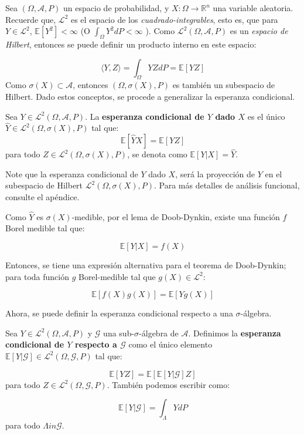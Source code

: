 

Sea $(\Omega, \mathcal{A}, P)$ un espacio de probabilidad, y $X: \Omega \rightarrow \mathbb{R}^n$ una variable aleatoria. Recuerde que, $\mathcal{L}^2$ es el espacio de los \textit{cuadrado-integrables}, esto es, que para $Y \in \mathcal{L}^2$, $\mathbb{E}[Y^2] < \infty$ (O $\int_{\Omega} Y^2 dP < \infty $ ). Como $\mathcal{L}^2 (\Omega, \mathcal{A}, P)$ es un \textit{espacio de Hilbert}, entonces se puede definir un producto interno en este espacio:

\[
	\langle Y, Z \rangle = \int_{\Omega} Y Z dP = \mathbb{E}[YZ]
\]
Como $\sigma(X) \subset \mathcal{A}$, entonces $(\Omega, \sigma(X), P)$ es también un subespacio de Hilbert. Dado estos conceptos, se procede a generalizar la esperanza condicional.

\begin{boxDef}
	Sea $Y \in \mathcal{L}^2 (\Omega, \mathcal{A}, P)$. La \textbf{esperanza condicional de $Y$ dado $X$} es el único $\hat{Y} \in \mathcal{L}^2 (\Omega, \sigma(X), P)$ tal que:
	\[
		\mathbb{E}[\hat{Y}X] = \mathbb{E}[YZ]
	\]
	para todo $Z \in \mathcal{L}^2 (\Omega, \sigma(X), P)$, se denota como $\mathbb{E}[Y \vert X] = \hat{Y}$.
\end{boxDef}

Note que la esperanza condicional de $Y$ dado $X$, será la proyección de $Y$ en el subespacio de Hilbert $\mathcal{L}^2 (\Omega, \sigma(X), P)$. Para más detalles de análisis funcional, consulte el apéndice.

Como $\hat{Y}$ es $\sigma (X)$-medible, por el lema de Doob-Dynkin, existe una función $f$ Borel medible tal que:

\[
	\mathbb{E}[Y \vert X] = f(X)
\]

Entonces, se tiene una expresión alternativa para el teorema de Doob-Dynkin; para toda función $g$ Borel-medible tal que $g(X) \in \mathcal{L}^2$:

\[
	\mathbb{E}[f(X) g(X)] = \mathbb{E}[Y g(X)]
\]

Ahora, se puede definir la esperanza condicional respecto a una $\sigma$-álgebra.

\begin{boxDef}
	Sea $Y \in \mathcal{L}^2 (\Omega, \mathcal{A}, P)$ y $\mathcal{G}$ una sub-$\sigma$-álgebra de $\mathcal{A}$. Definimos la \textbf{esperanza condicional de $Y$ respecto a $\mathcal{G}$} como el único elemento $\mathbb{E}[Y \vert \mathcal{G}] \in \mathcal{L}^2 (\Omega, \mathcal{G}, P)$ tal que:

	\[
		\mathbb{E}[Y Z] = \mathbb{E}[ \mathbb{E}[Y \vert \mathcal{G}] Z ]
	\] 
	para todo $Z \in \mathcal{L}^2 (\Omega, \mathcal{G}, P)$. También podemos escribir como:

	\[
		\mathbb{E}[Y \vert \mathcal{G}] = \int_{\Lambda} Y dP
	\]
	para todo $\Lambda in \mathcal{G}$.
\end{boxDef}

